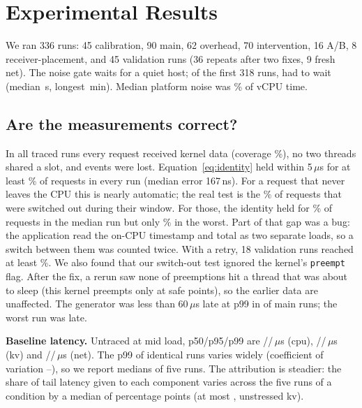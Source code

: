 \section{Experimental Results}
\label{sec:results}

We ran 336 runs: 45 calibration, 90 main, 62 overhead, 70 intervention,
16 A/B, 8 receiver-placement, and 45 validation runs (36 repeats after two
fixes, 9 fresh net). The noise gate waits for a quiet host; of the first 318 runs, \nwWaited{} had to wait (median
\nwMed\,s, longest \nwMax\,min). Median platform noise was \noiseMed\% of
vCPU time.

\subsection{Are the measurements correct?}
In all \valRuns{} traced runs every request received kernel data (coverage
\valCoverage\%), no two threads shared a slot, and \valDrops{} events were
lost. Equation~\eqref{eq:identity} held within 5\,$\mu$s for at least
\valWithin\% of requests in every run (median error 167\,ns). For a request
that never leaves the CPU this is nearly automatic; the real test is the
\idCampSwShare\% of requests that were switched out during their window.
For those, the identity held for \idCampSwMed\% of requests in the median
run but only \idCampSwMin\% in the worst. Part of that gap was a bug: the
application read the on-CPU timestamp and total as two separate loads, so a
switch between them was counted twice. With a retry, 18 validation runs
reached at least \idFixOneSwMin\%. We also found that our switch-out test
ignored the kernel's \texttt{preempt} flag. After the fix,
a rerun saw none of \preAll{} preemptions hit a thread that was about to
sleep (this kernel preempts only at safe points), so the earlier data are
unaffected. The generator was less than 60\,$\mu$s late at p99 in \genOk{}
of \genAll{} main runs; the worst run was \genMax{} late.

\textbf{Baseline latency.} Untraced at mid load, p50/p95/p99 are
\latCpuMidPFifty/\latCpuMidPNinetyFive/\latCpuMidPNinetyNine\,$\mu$s (cpu),
\latKvMidPFifty/\latKvMidPNinetyFive/\latKvMidPNinetyNine\,$\mu$s (kv) and
\latNetMidPFifty/\latNetMidPNinetyFive/\latNetMidPNinetyNine\,$\mu$s (net).
The p99 of identical runs varies widely (coefficient of variation
\cvMin--\cvMax), so we report medians of five runs. The attribution is
steadier: the share of tail latency given to each component varies across
the five runs of a condition by a median of \stabMed{} percentage points (at
most \stabMax, unstressed kv).

